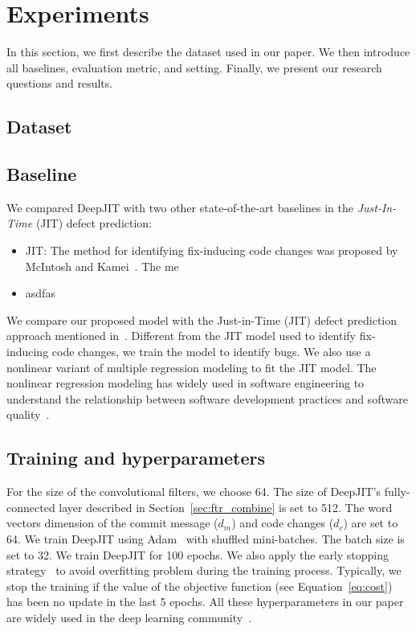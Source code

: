 \section{Experiments}
\label{sec:exp}
In this section, we first describe the dataset used in our paper. We then introduce all baselines, evaluation metric, and setting. Finally, we present our research questions and results.

\subsection{Dataset}
\label{sec:dataset}

\subsection{Baseline}
\label{sec:baseline}
We compared DeepJIT with two other state-of-the-art baselines in the \emph{Just-In-Time} (JIT) defect prediction:
\begin{itemize}
\item JIT: The method for identifying fix-inducing code changes was proposed by McIntosh and Kamei~\cite{mcintosh2018fix}. The me
\item asdfas
\end{itemize}

We compare our proposed model with the Just-in-Time (JIT) defect prediction approach mentioned in~\cite{mcintosh2018fix}. Different from the JIT model used to identify fix-inducing code changes, we train the model to identify bugs. We also use a nonlinear variant of multiple regression modeling to fit the JIT model. The nonlinear regression modeling has widely used in software engineering to understand the relationship between software development practices and software quality~\cite{zhou2011does, morales2015code, mcintosh2016empirical}. 

\subsection{Training and hyperparameters}
\label{sec:training_parameters}
For the size of the convolutional filters, we choose 64. The size of DeepJIT's fully-connected layer described in Section~\ref{sec:ftr_combine} is set to 512. The word vectors dimension of the commit message ($d_m$) and code changes ($d_c$) are set to 64. We train DeepJIT using Adam~\cite{kingma2014adam} with shuffled mini-batches.  The batch size is set to 32. We train DeepJIT for 100 epochs. We also apply the early stopping strategy~\cite{prechelt1998automatic, caruana2001overfitting} to avoid overfitting problem during the training process. Typically, we stop the training if the value of the objective function (see Equation~\ref{eq:cost}) has been no update in the last 5 epochs. All these hyperparameters in our paper are widely used in the deep learning community~\cite{severyn2015learning, huo2016learning, huo2017enhancing, hinton2012improving}. 
 

